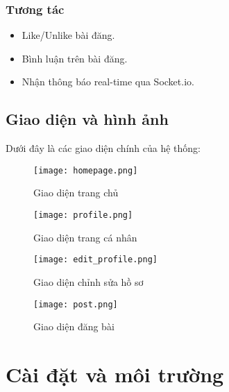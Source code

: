 \documentclass[a4paper,12pt]{article}
\begin{document}
	\subsubsection{Tương tác}
	\begin{itemize}
		\item Like/Unlike bài đăng.
		\item Bình luận trên bài đăng.
		\item Nhận thông báo real-time qua Socket.io.
	\end{itemize}
	
	\subsection{Giao diện và hình ảnh}
	Dưới đây là các giao diện chính của hệ thống:
	
	\begin{figure}[h]
		\centering
		\texttt{[image: homepage.png]}
		\caption{Giao diện trang chủ}
		\label{fig:homepage}
	\end{figure}
	
	\begin{figure}[h]
		\centering
		\texttt{[image: profile.png]}
		\caption{Giao diện trang cá nhân}
		\label{fig:profile}
	\end{figure}
	
	\begin{figure}[h]
		\centering
		\texttt{[image: edit\_profile.png]}
		\caption{Giao diện chỉnh sửa hồ sơ}
		\label{fig:edit_profile}
	\end{figure}
	
	\begin{figure}[h]
		\centering
		\texttt{[image: post.png]}
		\caption{Giao diện đăng bài}
		\label{fig:post}
	\end{figure}
	
	\section{Cài đặt và môi trường}
	
\end{document}
